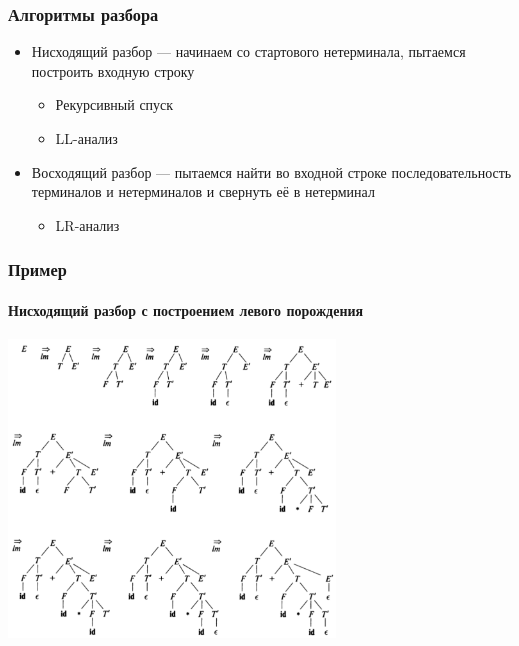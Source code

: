 \documentclass[xetex,mathserif,serif]{beamer}
\begin{document}
	\begin{frame}
		\frametitle{Алгоритмы разбора}
		\begin{itemize}
			\item Нисходящий разбор --- начинаем со стартового нетерминала, пытаемся построить входную строку
			\begin{itemize}
				\item Рекурсивный спуск
				\item LL-анализ
			\end{itemize}
			\item Восходящий разбор --- пытаемся найти во входной строке последовательность терминалов и нетерминалов и свернуть её в нетерминал
			\begin{itemize}
				\item LR-анализ
			\end{itemize}
		\end{itemize}
	\end{frame}

	\begin{frame}
		\frametitle{Пример}
		\framesubtitle{Нисходящий разбор с построением левого порождения}
		\begin{center}
			\includegraphics[width=0.65\textwidth]{topDownAnalysis.png}
		\end{center}
	\end{frame}
\end{document}
